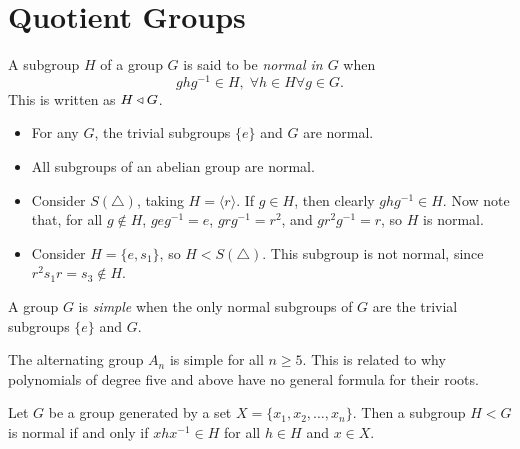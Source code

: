 \section{Quotient Groups}

\begin{defn}
    A subgroup $H$ of a group $G$ is said to be \emph{normal in $G$} when
    \[ghg^{-1} \in H,\; \forall h \in H \forall g \in G.\]
    This is written as $H \triangleleft G$.
\end{defn}

\begin{exmp}\proofbreak
    \begin{itemize}
        \item For any $G$, the trivial subgroups $\{e\}$ and $G$ are normal.
        \item All subgroups of an abelian group are normal.
        \item Consider $S(\triangle)$, taking $H = \langle r \rangle$. If $g \in H$, then clearly $ghg^{-1} \in H$. Now note that, for all $g \notin H$, $geg^{-1} = e$, $grg^{-1} = r^2$, and $gr^2g^{-1} = r$, so $H$ is normal.
        \item Consider $H = \{e, s_1\}$, so $H < S(\triangle)$. This subgroup is not normal, since $r^2s_1r = s_3 \notin H$.
    \end{itemize}
\end{exmp}

\begin{defn}
    A group $G$ is \emph{simple} when the only normal subgroups of $G$ are the trivial subgroups $\{e\}$ and $G$.
\end{defn}

\begin{exmp}
    The alternating group $A_n$ is simple for all $n \geq 5$. This is related to why polynomials of degree five and above have no general formula for their roots.
\end{exmp}

\begin{thm}\label{generator-normal-subgroup}
    Let $G$ be a group generated by a set $X = \{x_1, x_2, \ldots, x_n\}$. Then a subgroup $H < G$ is normal if and only if $xhx^{-1} \in H$ for all $h \in H$ and $x \in X$.
\end{thm}

